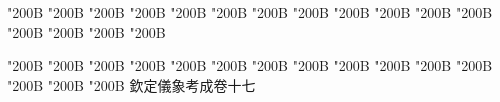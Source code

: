 \begin{正文}
\char"200B\relax{}
\char"200B\relax{}
\char"200B\relax{}
\char"200B\relax{}
\char"200B\relax{}
\char"200B\relax{}
\char"200B\relax{}
\char"200B\relax{}
\char"200B\relax{}
\char"200B\relax{}
\char"200B\relax{}
\char"200B\relax{}
\char"200B\relax{}
\char"200B\relax{}
\char"200B\relax{}
\char"200B\relax
{}\par
\end{正文}\clearpage
{}
\begin{正文}
\char"200B\relax{}
\char"200B\relax{}
\char"200B\relax{}
\char"200B\relax{}
\char"200B\relax{}
\char"200B\relax{}
\char"200B\relax{}
\char"200B\relax{}
\char"200B\relax{}
\char"200B\relax{}
\char"200B\relax{}
\char"200B\relax{}
\char"200B\relax{}
\char"200B\relax{}
\char"200B\relax{}
欽定儀象考成卷十七
\par

\par\end{正文}\clearpage
